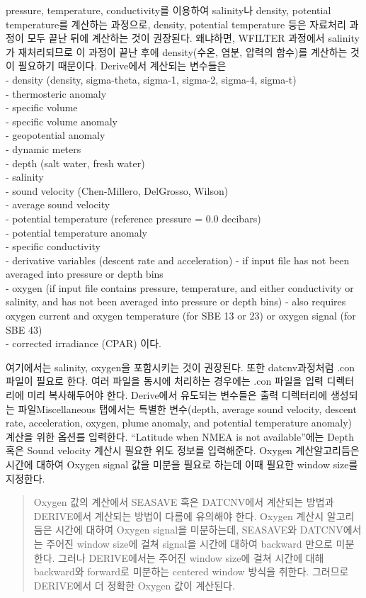 \documentclass[
]{book}
\begin{document}
pressure, temperature, conductivity를 이용하여 salinity나 density, potential temperature를 계산하는 과정으로, density, potential temperature 등은 자료처리 과정이 모두 끝난 뒤에 계산하는 것이 권장된다. 왜냐하면, WFILTER 과정에서 salinity가 재처리되므로 이 과정이 끝난 후에 density(수온, 염분, 압력의 함수)를 계산하는 것이 필요하기 때문이다.
Derive에서 계산되는 변수들은\\
- density (density, sigma-theta, sigma-1, sigma-2, sigma-4, sigma-t)\\
- thermosteric anomaly\\
- specific volume\\
- specific volume anomaly\\
- geopotential anomaly\\
- dynamic meters\\
- depth (salt water, fresh water)\\
- salinity\\
- sound velocity (Chen-Millero, DelGrosso, Wilson)\\
- average sound velocity\\
- potential temperature (reference pressure = 0.0 decibars)\\
- potential temperature anomaly\\
- specific conductivity\\
- derivative variables (descent rate and acceleration) - if input file has not been averaged into pressure or depth bins\\
- oxygen (if input file contains pressure, temperature, and either conductivity or salinity, and has not been averaged into pressure or depth bins) - also requires oxygen current and oxygen temperature (for SBE 13 or 23) or oxygen signal (for SBE 43)\\
- corrected irradiance (CPAR) 이다.

여기에서는 salinity, oxygen을 포함시키는 것이 권장된다. 또한 datcnv과정처럼 .con 파일이 필요로 한다. 여러 파일을 동시에 처리하는 경우에는 .con 파일을 입력 디렉터리에 미리 복사해두어야 한다. Derive에서 유도되는 변수들은 출력 디렉터리에 생성되는 파일Miscellaneous 탭에서는 특별한 변수(depth, average sound velocity, descent rate, acceleration, oxygen, plume anomaly, and potential temperature anomaly) 계산을 위한 옵션를 입력한다. ``Latitude when NMEA is not available''에는 Depth 혹은 Sound velocity 계산시 필요한 위도 정보를 입력해준다. Oxygen 계산알고리듬은 시간에 대하여 Oxygen signal 값을 미분을 필요로 하는데 이때 필요한 window size를 지정한다.

\begin{quote}
Oxygen 값의 계산에서 SEASAVE 혹은 DATCNV에서 계산되는 방법과 DERIVE에서 계산되는 방법이 다름에 유의해야 한다. Oxygen 계산시 알고리듬은 시간에 대하여 Oxygen signal을 미분하는데, SEASAVE와 DATCNV에서는 주어진 window size에 걸쳐 signal을 시간에 대하여 backward 만으로 미분한다. 그러나 DERIVE에서는 주어진 window size에 걸쳐 시간에 대해 backward와 forward로 미분하는 centered window 방식을 취한다. 그러므로 DERIVE에서 더 정확한 Oxygen 값이 계산된다.
\end{quote}
\end{document}
